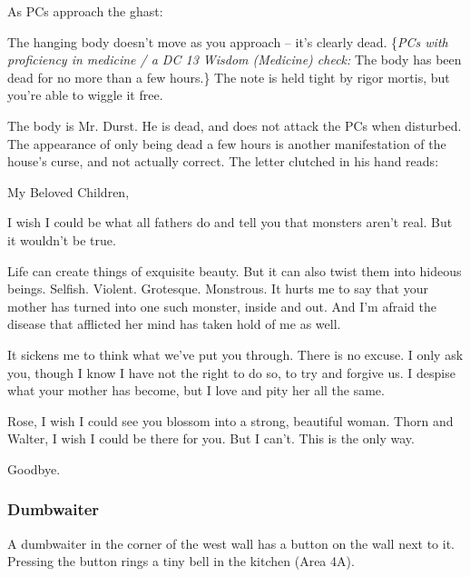 As PCs approach the ghast:
\begin{readout}
  The hanging body doesn't move as you approach -- it's clearly dead. \{\textit{PCs with proficiency
  in medicine / a DC 13 Wisdom (Medicine) check:} The body has been dead for no more than a few hours.\}
  The note is held tight by rigor mortis, but you're able to wiggle it free.
\end{readout}
The body is Mr. Durst. He is dead, and does not attack the PCs when disturbed. The appearance of only being
dead a few hours is another manifestation of the house's curse, and not actually correct.
The letter clutched in his hand reads:
\begin{handout}
  My Beloved Children,
  
  I wish I could be what all fathers do and tell you that monsters aren't real. But it wouldn't be true.
  
  Life can create things of exquisite beauty. But it can also twist them into hideous beings. Selfish. Violent.
  Grotesque. Monstrous. It hurts me to say that your mother has turned into one such monster, inside and out.
  And I'm afraid the disease that afflicted her mind has taken hold of me as well.
  
  It sickens me to think what we've put you through. There is no excuse. I only ask you, though I know I have
  not the right to do so, to try and forgive us. I despise what your mother has become, but I love and pity
  her all the same.
  
  Rose, I wish I could see you blossom into a strong, beautiful woman. Thorn and Walter, I wish I could be
  there for you. But I can't. This is the only way.
  
  Goodbye.
\end{handout}

\subsubsection*{Dumbwaiter}
A dumbwaiter in the corner of the west wall has a button on the wall next to it. Pressing the button rings a
tiny bell in the kitchen (Area 4A).

